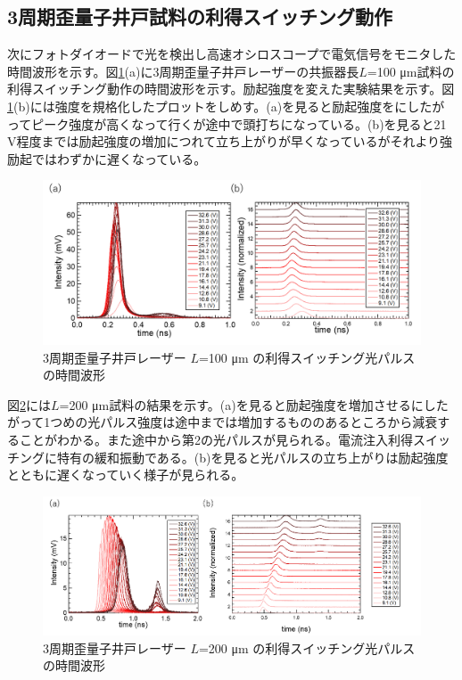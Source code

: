 {{\subsection{3周期歪量子井戸試料の利得スイッチング動作}%
次にフォトダイオードで光を検出し高速オシロスコープで電気信号をモニタした時間波形を示す。図\ref{fig:fig_3_2_3QW_ridge_L100_GS}(a)に3周期歪量子井戸レーザーの共振器長$L$=100 \si{\micro\metre}試料の利得スイッチング動作の時間波形を示す。励起強度を変えた実験結果を示す。図\ref{fig:fig_3_2_3QW_ridge_L100_GS}(b)には強度を規格化したプロットをしめす。(a)を見ると励起強度をにしたがってピーク強度が高くなって行くが途中で頭打ちになっている。(b)を見ると21 V程度までは励起強度の増加につれて立ち上がりが早くなっているがそれより強励起ではわずかに遅くなっている。
\begin{figure}[h]
	\centering
	\includegraphics[width=15cm]{figure/fig_3_2_3QW_ridge_L100_GS.png}
		\caption{3周期歪量子井戸レーザー $L$=100 \si{\micro\metre} の利得スイッチング光パルスの時間波形}
		\label{fig:fig_3_2_3QW_ridge_L100_GS}
\end{figure}


図\ref{fig:fig_3_2_3QW_ridge_L200_GS}には$L$=200 \si{\micro\metre}試料の結果を示す。(a)を見ると励起強度を増加させるにしたがって1つめの光パルス強度は途中までは増加するもののあるところから減衰することがわかる。また途中から第2の光パルスが見られる。電流注入利得スイッチングに特有の緩和振動である。(b)を見ると光パルスの立ち上がりは励起強度とともに遅くなっていく様子が見られる。


\begin{figure}[h]
	\centering
	\includegraphics[width=15cm]{figure/fig_3_2_3QW_ridge_L200_GS.png}
		\caption{3周期歪量子井戸レーザー $L$=200 \si{\micro\metre} の利得スイッチング光パルスの時間波形}
		\label{fig:fig_3_2_3QW_ridge_L200_GS}
\end{figure}



}}
